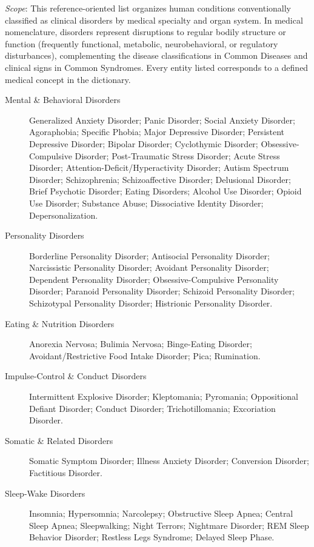 \small
\noindent\textit{Scope}: This reference-oriented list organizes human conditions conventionally classified as clinical disorders by medical specialty and organ system. In medical nomenclature, disorders represent disruptions to regular bodily structure or function (frequently functional, metabolic, neurobehavioral, or regulatory disturbances), complementing the disease classifications in Common Diseases and clinical signs in Common Syndromes. Every entity listed corresponds to a defined medical concept in the dictionary.

\medskip
\begin{description}
\item[Mental \& Behavioral Disorders] Generalized Anxiety Disorder; Panic Disorder; Social Anxiety Disorder; Agoraphobia; Specific Phobia; Major Depressive Disorder; Persistent Depressive Disorder; Bipolar Disorder; Cyclothymic Disorder; Obsessive-Compulsive Disorder; Post-Traumatic Stress Disorder; Acute Stress Disorder; Attention-Deficit/Hyperactivity Disorder; Autism Spectrum Disorder; Schizophrenia; Schizoaffective Disorder; Delusional Disorder; Brief Psychotic Disorder; Eating Disorders; Alcohol Use Disorder; Opioid Use Disorder; Substance Abuse; Dissociative Identity Disorder; Depersonalization.

\item[Personality Disorders] Borderline Personality Disorder; Antisocial Personality Disorder; Narcissistic Personality Disorder; Avoidant Personality Disorder; Dependent Personality Disorder; Obsessive-Compulsive Personality Disorder; Paranoid Personality Disorder; Schizoid Personality Disorder; Schizotypal Personality Disorder; Histrionic Personality Disorder.

\item[Eating \& Nutrition Disorders] Anorexia Nervosa; Bulimia Nervosa; Binge-Eating Disorder; Avoidant/Restrictive Food Intake Disorder; Pica; Rumination.

\item[Impulse-Control \& Conduct Disorders] Intermittent Explosive Disorder; Kleptomania; Pyromania; Oppositional Defiant Disorder; Conduct Disorder; Trichotillomania; Excoriation Disorder.

\item[Somatic \& Related Disorders] Somatic Symptom Disorder; Illness Anxiety Disorder; Conversion Disorder; Factitious Disorder.

\item[Sleep-Wake Disorders] Insomnia; Hypersomnia; Narcolepsy; Obstructive Sleep Apnea; Central Sleep Apnea; Sleepwalking; Night Terrors; Nightmare Disorder; REM Sleep Behavior Disorder; Restless Legs Syndrome; Delayed Sleep Phase.


\end{description}
